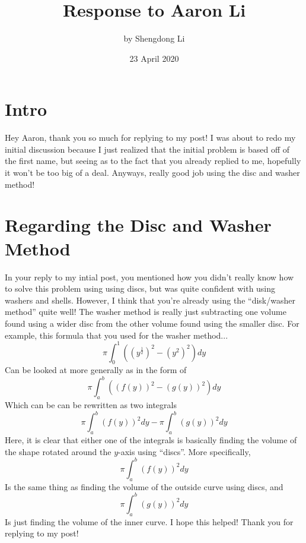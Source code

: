 \documentclass[letterpaper, 12pt]{article}
\begin{document}
\title{Response to Aaron Li}
\author{by Shengdong Li}
\date{23 April 2020}
\maketitle

\section{Intro}
Hey Aaron, thank you so much for replying to my post! I was about to redo my initial discussion because I just realized that the initial problem is based off of the first name, but seeing as to the fact that you already replied to me, hopefully it won't be too big of a deal. Anyways, really good job using the disc and washer method!

\section{Regarding the Disc and Washer Method}
In your reply to my intial post, you mentioned how you didn't really know how to solve this problem using using discs, but was quite confident with using washers and shells. However, I think that you're already using the ``disk/washer method'' quite well! The washer method is really just subtracting one volume found using a wider disc from the other volume found using the smaller disc. For example, this formula that you used for the washer method...
$$
\pi\int_{0}^{1}\left(\left(y^{\frac{1}{2}}\right)^{2}-\left(y^{2}\right)^{2}\right)dy
$$
Can be looked at more generally as in the form of
$$
\pi\int_{a}^{b}\left(\left(f\left(y\right)\right)^{2}-\left(g\left(y\right)\right)^{2}\right)dy
$$
Which can be can be rewritten as two integrals
$$
\pi\int_{a}^{b}\left(f\left(y\right)\right)^{2}dy-\pi\int_{a}^{b}\left(g\left(y\right)\right)^{2}dy
$$
Here, it is clear that either one of the integrals is basically finding the volume of the shape rotated around the $y$-axis using ``discs''. More specifically,
$$
\pi\int_{a}^{b}\left(f\left(y\right)\right)^{2}dy
$$
Is the same thing as finding the volume of the outside curve using discs, and 
$$
\pi\int_{a}^{b}\left(g\left(y\right)\right)^{2}dy
$$
Is just finding the volume of the inner curve. I hope this helped! Thank you for replying to my post!
\end{document}
